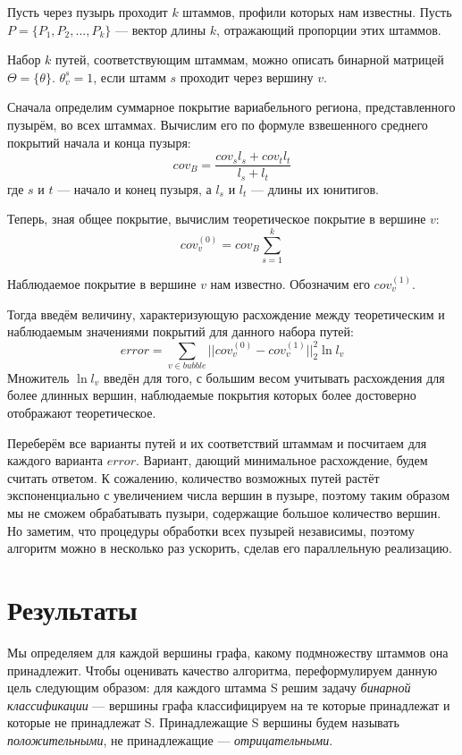\documentclass{spbau-diploma}
\begin{document}
Пусть через пузырь проходит $k$ штаммов, профили которых нам известны. Пусть $P=\{P_1,P_2,...,P_k\}$ --- вектор длины $k$, отражающий пропорции этих штаммов.

Набор $k$ путей, соответствующим штаммам, можно описать бинарной матрицей $\Theta=\{\theta\}$. $\theta_{v}^{s} = 1$, если штамм $s$ проходит через вершину $v$.

Сначала определим суммарное покрытие вариабельного региона, представленного пузырём, во всех штаммах. Вычислим его по формуле взвешенного среднего покрытий начала и конца пузыря: $$cov_{B} = \frac{cov_s l_s + cov_t l_t}{l_s + l_t}$$ где $s$ и $t$ --- начало и конец пузыря, а $l_s$ и $l_t$ --- длины их юнитигов.

Теперь, зная общее покрытие, вычислим теоретическое покрытие в вершине $v$: 
$$cov_{v}^{(0)} = cov_{B} \sum_{s=1}^{k}$$

Наблюдаемое покрытие в вершине $v$ нам известно. Обозначим его $cov_v^{(1)}$.

Тогда введём величину, характеризующую расхождение между теоретическим и наблюдаемым значениями покрытий для данного набора путей:
$$error = \sum_{v \in bubble} ||cov_{v}^{(0)} - cov_{v}^{(1)}||_2^2 \ln l_{v}$$
Множитель $\ln l_v$ введён для того, с большим весом учитывать расхождения для более длинных вершин, наблюдаемые покрытия которых более достоверно отображают теоретическое.

Переберём все варианты путей и их соответствий штаммам и посчитаем для каждого варианта $error$. 
Вариант, дающий минимальное расхождение, будем считать ответом.
К сожалению, количество возможных путей растёт экспоненциально с увеличением числа вершин в пузыре, поэтому таким образом мы не сможем обрабатывать пузыри, содержащие большое количество вершин. 
Но заметим, что процедуры обработки всех пузырей независимы, поэтому алгоритм можно в несколько раз ускорить, сделав его параллельную реализацию.



\section{Результаты}

Мы определяем для каждой вершины графа, какому подмножеству штаммов она принадлежит. Чтобы оценивать качество алгоритма, переформулируем данную цель следующим образом: для каждого штамма S решим задачу \textit{бинарной классификации} --- вершины графа классифицируем на те которые принадлежат и которые не принадлежат S. Принадлежащие S вершины будем называть \textit{положительными}, не принадлежащие --- \textit{отрицательными}.
\end{document}
